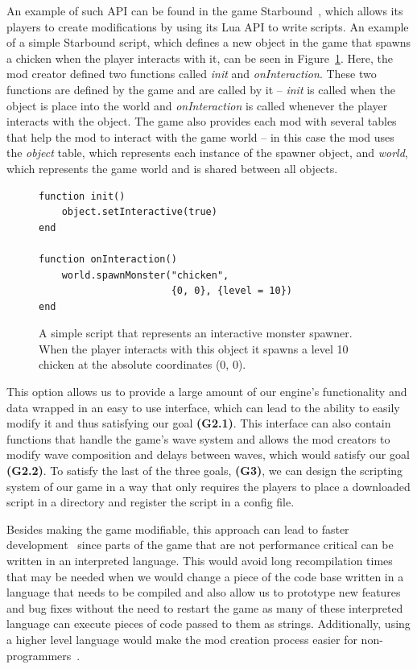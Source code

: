 An example of such API can be found in the game Starbound~\cite{Starbound}, which allows its
players to create modifications by using its Lua API to write scripts. An example of a simple Starbound script,
which defines a new object in the game that spawns a chicken when the player interacts with it,
can be seen in Figure~\ref{sb-lua-mod-ex}. Here, the mod creator defined two functions called \emph{init} and
\emph{onInteraction}. These two functions are defined by the game and are called by it
-- \emph{init} is called when the object is place into the world and \emph{onInteraction} is called
whenever the player interacts with the object. The game also provides each mod with several tables that
help the mod to interact with the game world -- in this case the mod uses the \emph{object} table, which
represents each instance of the spawner object, and \emph{world}, which represents the game world and
is shared between all objects.

\begin{figure}[h]
    \centering
    \begin{lstlisting}
function init()
    object.setInteractive(true)
end

function onInteraction()
    world.spawnMonster("chicken",
                       {0, 0}, {level = 10})
end
    \end{lstlisting}
    \caption{A simple script that represents an interactive monster spawner. When the player interacts
            with this object it spawns a level 10 chicken at the absolute coordinates (0, 0).}
    \label{sb-lua-mod-ex}
\end{figure}

This option allows us to provide a large amount of our engine's functionality and data wrapped in an easy to use interface, which can lead
to the ability to easily modify it and thus satisfying our goal \textbf{(G2.1)}. This interface can also contain functions that handle the
game's wave system and allows the mod creators to modify wave composition and delays between waves, which would satisfy our goal
\textbf{(G2.2)}. To satisfy the last of the three goals, \textbf{(G3)}, we can design the scripting system of our game in a way that only
requires the players to place a downloaded script in a directory and register the script in a config file.

Besides making the game modifiable, this approach can lead to faster development~\cite{GEA} since parts of the game that are not performance
critical can be written in an interpreted language. This would avoid long recompilation times that
may be needed when we would change a piece of the code base written in a language that needs to be compiled and also allow 
us to prototype new features and bug fixes
without the need to restart the game as many of these interpreted language can execute pieces of code passed to them as strings.
Additionally, using a higher level language would make the mod creation process easier for non-programmers~\cite{WhyScripting}.

